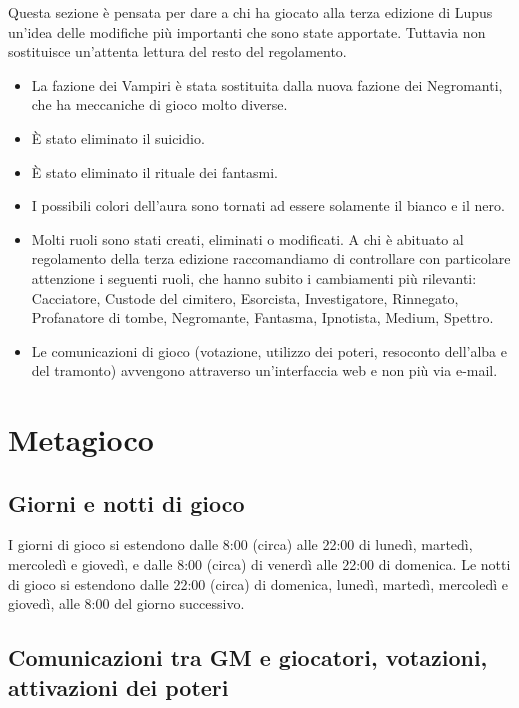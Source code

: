 \documentclass[a4paper,10pt]{article}
\begin{document}
Questa sezione è pensata per dare a chi ha giocato alla terza edizione di Lupus
un'idea delle modifiche più importanti che sono state apportate. Tuttavia non
sostituisce un'attenta lettura del resto del regolamento.

\begin{itemize}
 \item La fazione dei Vampiri è stata sostituita dalla nuova fazione dei
Negromanti, che ha meccaniche di gioco molto diverse.
 \item È stato eliminato il suicidio.
 \item È stato eliminato il rituale dei fantasmi.
 \item I possibili colori dell'aura sono tornati ad essere solamente il bianco e
il nero.
 \item Molti ruoli sono stati creati, eliminati o modificati. A chi è abituato
al regolamento della terza edizione raccomandiamo di controllare con particolare
attenzione i seguenti ruoli, che hanno subito i cambiamenti più rilevanti:
Cacciatore, Custode del cimitero, Esorcista, Investigatore, Rinnegato, Profanatore di tombe, Negromante, Fantasma,
Ipnotista, Medium, Spettro.
 \item Le comunicazioni di gioco (votazione, utilizzo dei poteri, resoconto
dell'alba e del tramonto) avvengono attraverso un'interfaccia web e non più via
e-mail.
\end{itemize}



\pagebreak
\section{Metagioco}

\subsection{Giorni e notti di gioco}

I giorni di gioco si estendono dalle 8:00 (circa) alle 22:00 di lunedì, martedì,
mercoledì e giovedì, e dalle 8:00 (circa) di venerdì alle 22:00 di domenica.
Le notti di gioco si estendono dalle 22:00 (circa) di domenica, lunedì, martedì, mercoledì e giovedì,
alle 8:00 del giorno successivo.



\subsection{Comunicazioni tra GM e giocatori, votazioni, attivazioni dei poteri}
\end{document}
